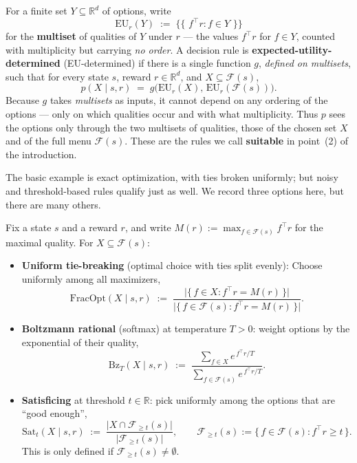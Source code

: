 \documentclass[11pt]{article}
\newcommand{\R}{\mathbb{R}}
\newcommand{\F}{\mathcal{F}}       %
\newcommand{\mset}[1]{\{\!\{\,#1\,\}\!\}}   %
\begin{document}
\begin{definition}\label{def:eu_determined}
For a finite set $Y \subseteq \R^d$ of options, write
$$
\mathrm{EU}_r(Y) \;:=\; \mset{\, f^\top r : f \in Y \,}
$$
for the \textbf{multiset} of qualities of $Y$ under $r$ --- the values $f^\top r$ for
$f \in Y$, counted with multiplicity but carrying \emph{no order}. A decision rule is
\textbf{expected-utility-determined} (EU-determined) if there is a single function $g$,
\emph{defined on multisets}, such that for every state $s$, reward $r \in \R^d$, and
$X \subseteq \F(s)$,
$$
p(X \mid s, r) \;=\; g\bigl(\mathrm{EU}_r(X),\, \mathrm{EU}_r(\F(s))\bigr).
$$
Because $g$ takes \emph{multisets} as inputs, it cannot depend on any ordering of the
options --- only on which qualities occur and with what multiplicity. Thus $p$ sees the
options only through the two multisets of qualities, those of the chosen set $X$ and of the
full menu $\F(s)$. These are the rules we call \textbf{suitable} in point~(2) of the
introduction.
\end{definition}

The basic example is exact optimization, with ties broken uniformly; but noisy and
threshold-based rules qualify just as well. We record three options here, but there are many others.

\begin{definition}\label{def:rules}
Fix a state $s$ and a reward $r$, and write $M(r) := \max_{f \in \F(s)} f^\top r$ for the
maximal quality.  For $X \subseteq \F(s)$:
\begin{itemize}\itemsep=5pt
  \item \textbf{Uniform tie-breaking} (optimal choice with ties split evenly): Choose uniformly among all maximizers,
  $$
  \mathrm{FracOpt}(X \mid s, r) \;:=\;
  \frac{\bigl|\{\, f \in X : f^\top r = M(r) \,\}\bigr|}{\bigl|\{\, f \in \F(s) : f^\top r = M(r) \,\}\bigr|}.
  $$
  \item \textbf{Boltzmann rational} (softmax) at temperature $T > 0$: weight options by the
  exponential of their quality,
  $$
  \mathrm{Bz}_T(X \mid s, r) \;:=\;
  \frac{\sum_{f \in X} e^{\,f^\top r / T}}{\sum_{f \in \F(s)} e^{\,f^\top r / T}}.
  $$
  \item \textbf{Satisficing} at threshold $t \in \R$: pick uniformly among the options that
  are ``good enough'',
  $$
  \mathrm{Sat}_t(X \mid s, r) \;:=\; \frac{\bigl|X \cap \F_{\ge t}(s)\bigr|}{\bigl|\F_{\ge t}(s)\bigr|},
  \qquad \F_{\ge t}(s) := \{\, f \in \F(s) : f^\top r \ge t \,\}.
  $$
  This is only defined if $\F_{\ge t}(s) \neq \emptyset$.
\end{itemize}
\end{definition}
\end{document}
